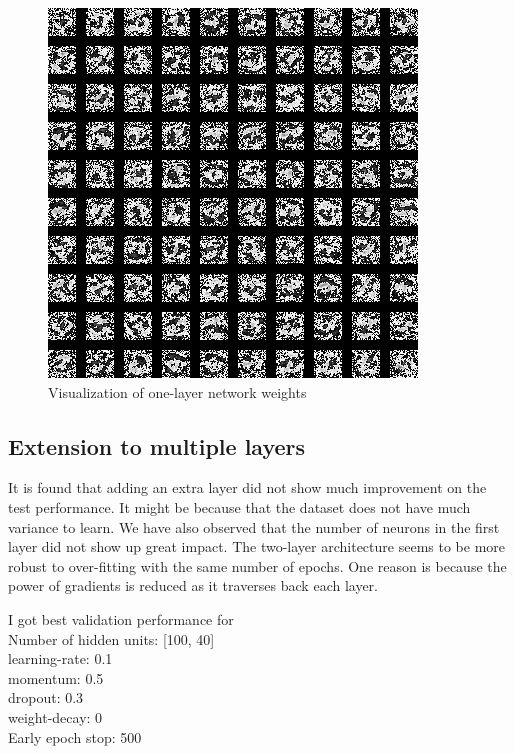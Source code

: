 \documentclass{article}
\begin{document}
\begin{figure}[!h]
  \centering
  \includegraphics[width=\textwidth]{figures/5g}
  \caption{Visualization of one-layer network weights}
  \label{fig:5g}
\end{figure}


\subsection{Extension to multiple layers}

It is found that adding an extra layer did not show much improvement on the test performance. It might be because that the dataset does not have much variance to learn. We have also observed that the number of neurons in the first layer did not show up great impact. The two-layer architecture seems to be more robust to over-fitting with the same number of epochs. One reason is because the power of gradients is reduced as it traverses back each layer.

I got best validation performance for \\
Number of hidden units: [100, 40] \\ 
learning-rate: 0.1 \\ 
momentum: 0.5 \\ 
dropout: 0.3 \\ 
weight-decay: 0 \\
Early epoch stop: 500 \\
\end{document}
